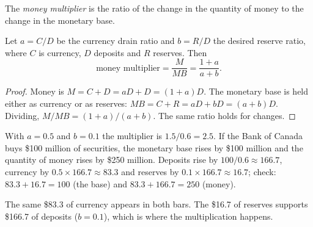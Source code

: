 \begin{definition}
The \emph{money multiplier} is the ratio of the change in the quantity of money to the
change in the monetary base.
\end{definition}

\begin{theorem}
Let $a = C/D$ be the currency drain ratio and $b = R/D$ the desired reserve ratio, where
$C$ is currency, $D$ deposits and $R$ reserves. Then
\[
  \text{money multiplier} = \frac{M}{MB} = \frac{1 + a}{a + b}.
\]
\end{theorem}

\begin{proof}
Money is $M = C + D = aD + D = (1 + a)D$. The monetary base is held either as currency
or as reserves: $MB = C + R = aD + bD = (a + b)D$. Dividing,
$M/MB = (1 + a)/(a + b)$. The same ratio holds for changes.
\end{proof}

\begin{example}
With $a = 0.5$ and $b = 0.1$ the multiplier is $1.5/0.6 = 2.5$. If the Bank of Canada
buys \$100 million of securities, the monetary base rises by \$100 million and the
quantity of money rises by \$250 million. Deposits rise by $100/0.6 \approx 166.7$,
currency by $0.5 \times 166.7 \approx 83.3$ and reserves by $0.1 \times 166.7 \approx 16.7$;
check: $83.3 + 16.7 = 100$ (the base) and $83.3 + 166.7 = 250$ (money).
\end{example}

\begin{center}
\end{center}
The same \$83.3 of currency appears in both bars. The \$16.7 of reserves supports
\$166.7 of deposits ($b = 0.1$), which is where the multiplication happens.

